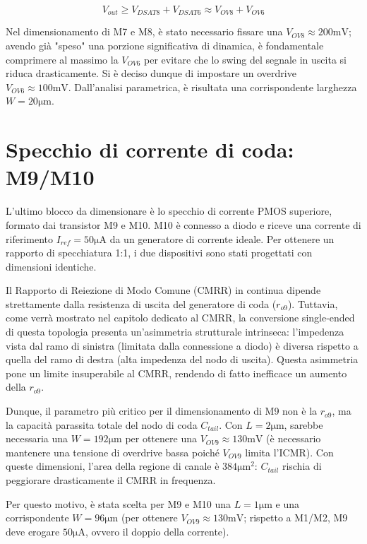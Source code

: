 \documentclass[12pt,a4paper,twoside]{report}
\begin{document}
$$V_{out} \ge V_{DSAT8} + V_{DSAT6} \approx V_{OV8} + V_{OV6}$$

\vspace{0.3cm}


\noindent Nel dimensionamento di M7 e M8, è stato necessario fissare una $V_{OV8} \approx 200\mathrm{mV}$; avendo già "speso" una porzione significativa di dinamica, è fondamentale comprimere al massimo la $V_{OV6}$ per evitare che lo swing del segnale in uscita si riduca drasticamente. Si è deciso dunque di impostare un overdrive $V_{OV6} \approx 100\mathrm{mV}$. Dall'analisi parametrica, è risultata una corrispondente larghezza $W = 20\mathrm{\mu m}$.

\section{Specchio di corrente di coda: M9/M10}

L'ultimo blocco da dimensionare è lo specchio di corrente PMOS superiore, formato dai transistor M9 e M10. M10 è connesso a diodo e riceve una corrente di riferimento $I_{ref}=50\mathrm{\mu A}$ da un generatore di corrente ideale. Per ottenere un rapporto di specchiatura 1:1, i due dispositivi sono stati progettati con dimensioni identiche.

Il Rapporto di Reiezione di Modo Comune (CMRR) in continua dipende strettamente dalla resistenza di uscita del generatore di coda ($r_{o9}$). Tuttavia, come verrà mostrato nel capitolo dedicato al CMRR, la conversione single-ended di questa topologia presenta un'asimmetria strutturale intrinseca: l'impedenza vista dal ramo di sinistra (limitata dalla connessione a diodo) è diversa rispetto a quella del ramo di destra (alta impedenza del nodo di uscita). Questa asimmetria pone un limite insuperabile al CMRR, rendendo di fatto inefficace un aumento della $r_{o9}$.

\noindent Dunque, il parametro più critico per il dimensionamento di M9 non è la $r_{o9}$, ma la capacità parassita totale del nodo di coda $C_{tail}$. Con $L=2\mathrm{\mu m}$, sarebbe necessaria una $W=192\mathrm{\mu m}$ per ottenere una $V_{OV9} \approx 130\mathrm{mV}$ (è necessario mantenere una tensione di overdrive bassa poiché $V_{OV9}$ limita l'ICMR). Con queste dimensioni, l'area della regione di canale è $384\mathrm{\mu m^2}$: $C_{tail}$ rischia di peggiorare drasticamente il CMRR in frequenza.

Per questo motivo, è stata scelta per M9 e M10 una $L=1\mathrm{\mu m}$ e una corrispondente $W=96\mathrm{\mu m}$ (per ottenere $V_{OV9} \approx 130\mathrm{mV}$; rispetto a M1/M2, M9 deve erogare $50\mathrm{\mu A}$, ovvero il doppio della corrente).
\end{document}

